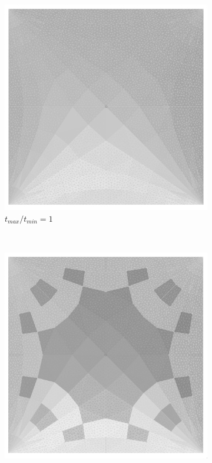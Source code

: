 \begin{figure}[H]
\begin{subfigure}[b]{.32\textwidth}
  \centering
  \includegraphics[width=.99\linewidth]{images/t_opt_l2d10_gamma1}
  \caption{$t_{max}/t_{min}=1$}
\end{subfigure}
~
\begin{subfigure}[b]{.32\textwidth}
  \centering
  \includegraphics[width=.99\linewidth]{images/t_opt_l2d10_gamma2}

\end{subfigure}
\end{figure}
